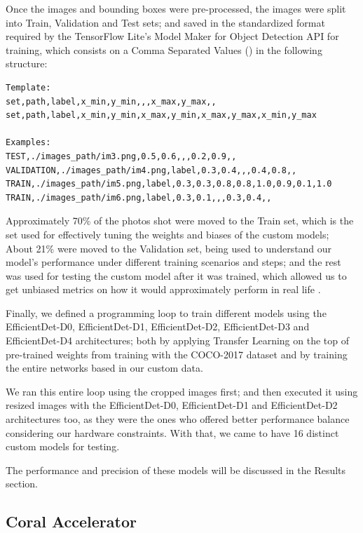 \documentclass[openright]{normas-utf-tex} %
\begin{document}
Once the images and bounding boxes were pre-processed, the images were split
into Train, Validation and Test sets; and saved in the standardized format
required by the TensorFlow Lite's Model Maker for Object Detection API for
training, which consists on a Comma Separated Values () in the following structure:

\begin{lstlisting}[caption={CSV format for specifying the Train, Test and Validation 
	image sets for training models using the TensorFlow's Model Maker API for Object 
	Detection},label={lst:csvFormatTrain}]
Template:
set,path,label,x_min,y_min,,,x_max,y_max,,
set,path,label,x_min,y_min,x_max,y_min,x_max,y_max,x_min,y_max

Examples:
TEST,./images_path/im3.png,0.5,0.6,,,0.2,0.9,,
VALIDATION,./images_path/im4.png,label,0.3,0.4,,,0.4,0.8,,
TRAIN,./images_path/im5.png,label,0.3,0.3,0.8,0.8,1.0,0.9,0.1,1.0
TRAIN,./images_path/im6.png,label,0.3,0.1,,,0.3,0.4,,
\end{lstlisting}

Approximately 70\% of the photos shot were moved to the Train set, which is the set used for effectively 
tuning the weights and biases of the custom models; About 21\% were moved to the Validation set, 
being used to understand our model's performance under different training scenarios and steps; 
and the rest was used for testing the custom model after it was trained, which allowed us to 
get unbiased metrics on how it would approximately perform in real life \cite{MluExplain}.

Finally, we defined a programming loop to train different models using the
EfficientDet-D0, EfficientDet-D1, EfficientDet-D2, EfficientDet-D3 and
EfficientDet-D4 architectures; both by applying Transfer Learning on the top of
pre-trained weights from training with the COCO-2017 dataset and by training
the entire networks based in our custom data. 

We ran this entire loop using the cropped images first; and then executed it
using resized images with the EfficientDet-D0, EfficientDet-D1 and
EfficientDet-D2 architectures too, as they were the ones who offered better
performance balance considering our hardware constraints. With that, we came to
have 16 distinct custom models for testing. 

The performance and precision of these models will be discussed in the Results section.

\subsection{Coral Accelerator}
\end{document}

